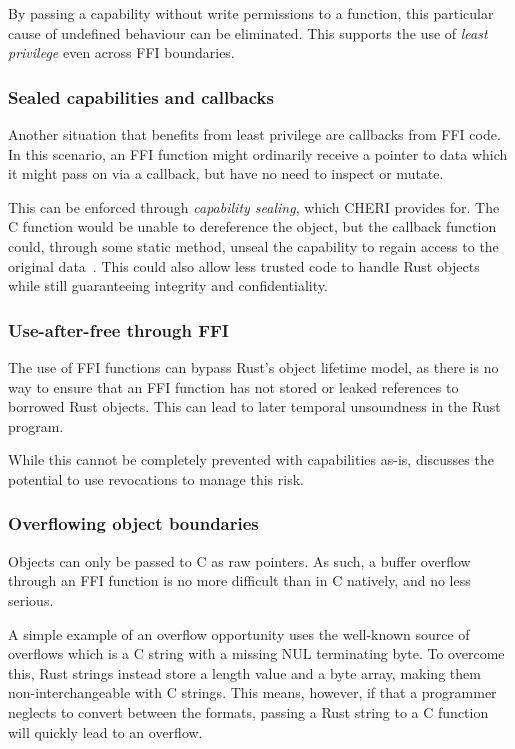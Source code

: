 \documentclass[dissertation.tex]{subfiles}
\begin{document}
By passing a capability without write permissions to a function, this
particular cause of undefined behaviour can be eliminated.
This supports the use of \emph{least privilege} even across FFI
boundaries.

\subsubsection{Sealed capabilities and callbacks}
Another situation that benefits from least privilege are callbacks from
FFI code.
In this scenario, an FFI function might ordinarily receive a pointer to
data which it might pass on via a callback, but have no need to inspect
or mutate.

This can be enforced through \emph{capability sealing}, which CHERI
provides for.
The C function would be unable to dereference the object, but the
callback function could, through some static method, unseal the
capability to regain access to the original data~\cite{cheri-v6}.
This could also allow less trusted code to handle Rust objects while
still guaranteeing integrity and confidentiality.

\subsubsection{Use-after-free through FFI}
The use of FFI functions can bypass Rust's object lifetime model, as
there is no way to ensure that an FFI function has not stored or leaked
references to borrowed Rust objects.
This can lead to later temporal unsoundness in the Rust program.

While this cannot be completely prevented with capabilities as-is,
 discusses the potential to use revocations
to manage this risk.

\subsubsection{Overflowing object boundaries}

Objects can only be passed to C as raw pointers.
As such, a buffer overflow through an FFI function is no more difficult
than in C natively, and no less serious.

A simple example of an overflow opportunity uses the well-known source
of overflows which is a C string with a missing NUL terminating byte.
To overcome this, Rust strings instead store a length value and a byte
array, making them non-interchangeable with C strings.
This means, however, if that a programmer neglects to convert between
the formats, passing a Rust string to a C function will quickly lead to
an overflow.
\end{document}
